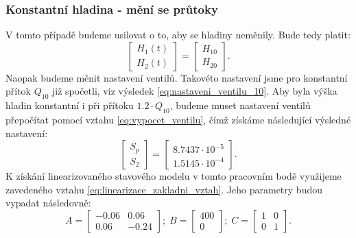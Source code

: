 \documentclass[a4paper,11pt]{article}
\begin{document}
\subsubsection{Konstantní hladina - mění se průtoky}\label{sec:2B}
V tomto případě budeme usilovat o to, aby se hladiny neměnily.
Bude tedy platit: 
\begin{equation}
\left [\begin{array}{cc}
H_{1}\left ( t \right ) \\
H_{2}\left ( t \right )
\end{array}\right ] = 
\left [\begin{array}{cc}
H_{10}\\
H_{20}\end{array}\right ].
\end{equation}
Naopak budeme měnit nastavení ventilů. Takovéto nastavení jsme pro konstantní přítok $ Q_{10} $ již spočetli, viz výsledek \ref{eq:nastaveni_ventilu_10}. Aby byla výška hladin konstantní i při přítoku $ 1.2 \cdot Q_{10} $, budeme muset nastavení ventilů přepočítat pomocí vztahu \ref{eq:vypocet_ventilu}, čímž získáme následující výsledné nastavení:
\begin{equation}\label{eq:nastaveni_ventilu_20}
\left [\begin{array}{cc}
S_{p} \\
S_{2}
\end{array}\right ] = 
\left [\begin{array}{cc}
8.7437\cdot 10^{-5}\\
1.5145\cdot 10^{-4}\end{array}\right ].
\end{equation}
K získání linearizovaného stavového modelu v tomto pracovním bodě využijeme zavedeného vztahu \ref{eq:linearizace_zakladni_vztah}. Jeho parametry budou vypadat následovně:
$$A =
\left [\begin{array}{cc}
-0.06  & 0.06 \\
0.06 & -0.24
\end{array}\right ];\;
B= 
\left [\begin{array}{cc}
400\\
0\end{array}\right ];\;
C=
\left [\begin{array}{cc}
1 & 0\\
0 & 1\end{array}\right ].
$$
\end{document}
